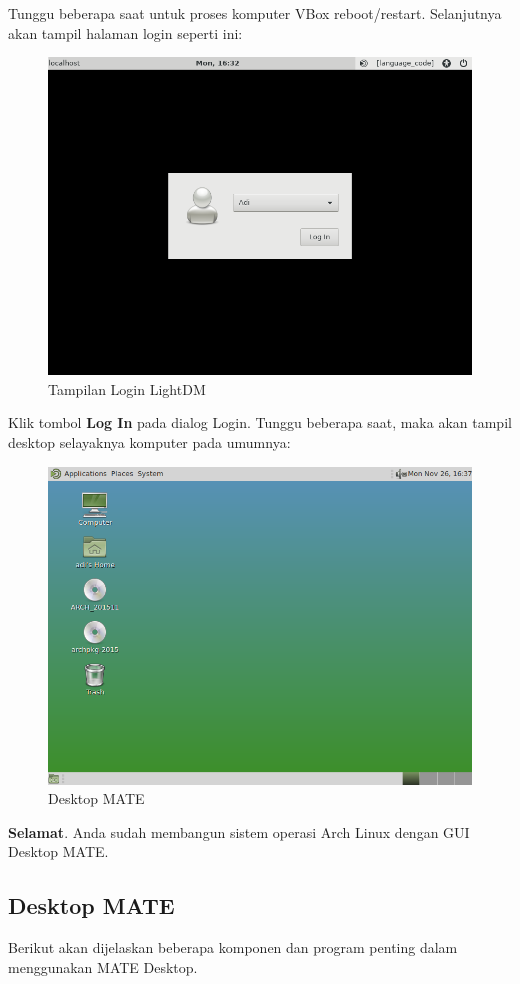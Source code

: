 \documentclass[12pt,]{article}
\begin{document}
	Tunggu beberapa saat untuk proses komputer VBox reboot/restart.
	Selanjutnya akan tampil halaman login seperti ini:
	\begin{figure}[H]
		\centering
		\includegraphics[width=0.6\linewidth]{images/vbox_gui/s1}
		\caption{Tampilan Login LightDM}
	\end{figure}
	Klik tombol \textbf{Log In} pada dialog Login.
	Tunggu beberapa saat, maka akan tampil desktop selayaknya komputer pada umumnya:
	\begin{figure}[H]
		\centering
		\includegraphics[width=0.6\linewidth]{images/vbox_gui/s2}
		\caption{Desktop MATE}
	\end{figure}
	\textbf{Selamat}. Anda sudah membangun sistem operasi Arch Linux dengan GUI Desktop MATE.
	
	\subsection{Desktop MATE}
	Berikut akan dijelaskan beberapa komponen dan program penting dalam menggunakan MATE Desktop.
	
\end{document}
